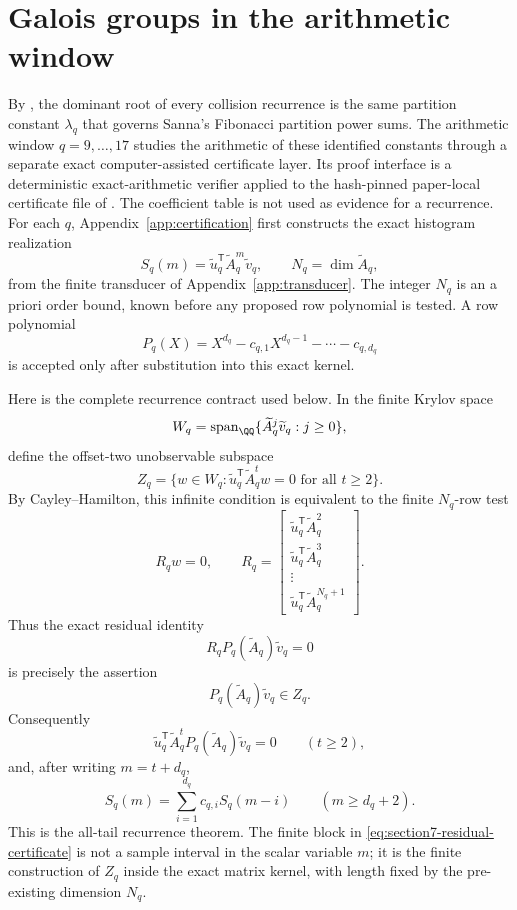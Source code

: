 ﻿\section{Galois groups in the arithmetic window}
\label{sec:chebotarev}

By , the dominant root of every collision recurrence is
the same partition constant \(\lambda_q\) that governs Sanna's Fibonacci
partition power sums.  The arithmetic window \(q=9,\dots,17\) studies the
arithmetic of these identified constants through a separate exact
computer-assisted certificate layer.  Its proof interface is a deterministic
exact-arithmetic verifier applied to the hash-pinned paper-local certificate
file of .  The coefficient table
is not used as evidence for a recurrence.  For each \(q\),
Appendix~\ref{app:certification} first constructs the exact
histogram realization
\[
  S_q(m)=\widetilde u_q^{\mathsf T}\widetilde A_q^m\widetilde v_q,
  \qquad N_q=\dim\widetilde A_q,
\]
from the finite transducer of Appendix~\ref{app:transducer}.  The integer
\(N_q\) is an a priori order bound, known before any proposed row polynomial is
tested.  A row polynomial
\[
  P_q(X)=X^{d_q}-c_{q,1}X^{d_q-1}-\cdots-c_{q,d_q}
\]
is accepted only after substitution into this exact kernel.

Here is the complete recurrence contract used below.  In the finite Krylov
space
\[
  W_q=\operatorname{span}_{\QQ}
  \{\widetilde A_q^j\widetilde v_q:j\ge0\},
\]
define the offset-two unobservable subspace
\[
  Z_q=
  \{w\in W_q:\widetilde u_q^{\mathsf T}\widetilde A_q^t w=0
    \text{ for all }t\ge2\}.
\]
By Cayley--Hamilton, this infinite condition is equivalent to the finite
\(N_q\)-row test
\begin{equation}
\label{eq:section7-primary-kernel-residual}
  R_qw=0,\qquad
  R_q=
  \begin{bmatrix}
  \widetilde u_q^{\mathsf T}\widetilde A_q^2\\
  \widetilde u_q^{\mathsf T}\widetilde A_q^3\\
  \vdots\\
  \widetilde u_q^{\mathsf T}\widetilde A_q^{N_q+1}
  \end{bmatrix}.
\end{equation}
Thus the exact residual identity
\begin{equation}
\label{eq:section7-residual-certificate}
  R_qP_q(\widetilde A_q)\widetilde v_q=0
\end{equation}
is precisely the assertion
\[
  P_q(\widetilde A_q)\widetilde v_q\in Z_q.
\]
Consequently
\[
  \widetilde u_q^{\mathsf T}\widetilde A_q^t
  P_q(\widetilde A_q)\widetilde v_q=0
  \qquad(t\ge2),
\]
and, after writing \(m=t+d_q\),
\[
  S_q(m)=\sum_{i=1}^{d_q}c_{q,i}S_q(m-i)
  \qquad(m\ge d_q+2).
\]
This is the all-tail recurrence theorem.  The finite block in
\eqref{eq:section7-residual-certificate} is not a sample interval in the scalar
variable \(m\); it is the finite construction of \(Z_q\) inside the exact matrix
kernel, with length fixed by the pre-existing dimension \(N_q\).

